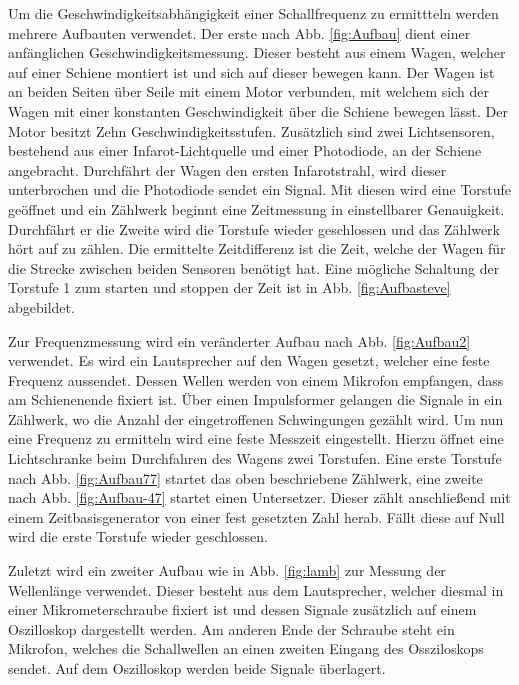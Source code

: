 Um die Geschwindigkeitsabhängigkeit einer Schallfrequenz zu ermittteln werden mehrere Aufbauten verwendet.
  Der erste nach Abb. \ref{fig:Aufbau} dient einer anfänglichen Geschwindigkeitsmessung. Dieser besteht aus einem Wagen, welcher
   auf einer Schiene montiert ist und sich auf dieser bewegen kann.
 Der Wagen ist an beiden Seiten über Seile  mit einem Motor verbunden, mit welchem sich
  der Wagen mit einer konstanten Geschwindigkeit über die Schiene bewegen lässt.
   Der Motor besitzt Zehn Geschwindigkeitsstufen.
Zusätzlich sind zwei Lichtsensoren, bestehend aus einer Infarot-Lichtquelle und
 einer Photodiode, an der Schiene angebracht.
    Durchfährt der Wagen
 den ersten Infarotstrahl, wird dieser unterbrochen und die Photodiode sendet ein Signal.
 Mit diesen wird eine Torstufe geöffnet und ein Zählwerk beginnt eine Zeitmessung in einstellbarer Genauigkeit. Durchfährt er die Zweite wird die Torstufe wieder
  geschlossen und das Zählwerk hört auf zu zählen. Die ermittelte Zeitdifferenz ist die Zeit, welche der Wagen für die Strecke zwischen beiden Sensoren benötigt hat.
    Eine mögliche Schaltung der Torstufe 1 zum starten und stoppen der Zeit ist in Abb. \ref{fig:Aufbasteve} abgebildet.


  Zur Frequenzmessung wird ein veränderter Aufbau nach Abb. \ref{fig:Aufbau2} verwendet. Es wird ein Lautsprecher auf den Wagen gesetzt,
   welcher eine feste Frequenz aussendet. Dessen Wellen werden von einem Mikrofon empfangen, dass am
  Schienenende fixiert ist. Über einen Impulsformer gelangen die Signale in ein Zählwerk, wo die Anzahl der eingetroffenen Schwingungen gezählt wird.
   Um nun eine Frequenz zu ermitteln wird eine feste Messzeit eingestellt. Hierzu öffnet
   eine Lichtschranke beim Durchfahren des Wagens zwei Torstufen. Eine erste Torstufe nach Abb. \ref{fig:Aufbau77}
    startet das oben beschriebene Zählwerk, eine zweite nach Abb. \ref{fig:Aufbau-47} startet einen Untersetzer.
     Dieser zählt anschließend mit einem Zeitbasisgenerator von einer fest gesetzten Zahl herab.
      Fällt diese auf Null wird die erste Torstufe wieder geschlossen.


       Zuletzt wird ein zweiter Aufbau wie in Abb. \ref{fig:lamb} zur Messung der Wellenlänge verwendet.
       Dieser besteht aus dem Lautsprecher, welcher diesmal in einer Mikrometerschraube fixiert
        ist und dessen Signale zusätzlich auf einem Oszilloskop dargestellt werden.
        Am anderen Ende der Schraube steht ein Mikrofon, welches die Schallwellen an einen zweiten Eingang
         des Ossziloskops sendet. Auf dem Oszilloskop werden beide Signale überlagert.
